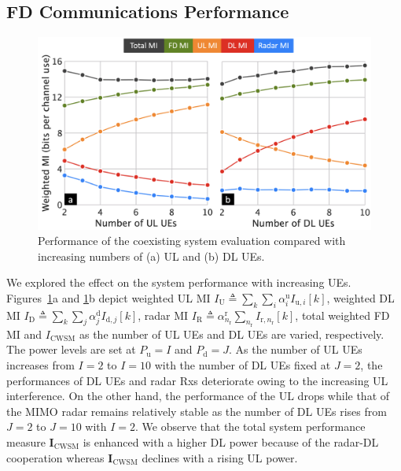 \documentclass[9pt,journal]{IEEEtran}
\newcommand{\bracket}[1]{{\left [{#1}\right ]}}
\newcommand{\rr}{_\mathrm{r}}
\theoremstyle{definition}
\begin{document}
{\subsection{FD Communications Performance}
\label{subsec: fd_comm_eva}
\begin{figure}[t]
\vspace{-1em}
\centering
\includegraphics[width=0.9\columnwidth]{fd_UE.png}
\caption{Performance of the coexisting system evaluation compared with increasing numbers of (a) UL and (b) DL UEs.}
\label{fig:fd_UE}
\vspace{-1em}
\end{figure}
We explored the effect on the system performance with increasing UEs. Figures~\ref{fig:fd_UE}a and \ref{fig:fd_UE}b depict weighted UL MI $\mathit{I}_{\textrm{U}}\triangleq\sum_{k}\sum_{i}\alpha^\textrm{u}_i\mathit{I}_{\textrm{u},i}\bracket{k}$, weighted DL MI $\mathit{I}_{\textrm{D}}\triangleq\sum_{k}\sum_{j}\alpha^\textrm{d}_j\mathit{I}_{\textrm{d},j}\bracket{k}$, radar MI $\mathit{I}_{\textrm{R}}\triangleq\alpha^\textrm{r}_{n\rr}\sum_{n\rr}\mathit{I}_{\textrm{r},n\rr}\bracket{k}$, total weighted FD MI and $\mathit{I}_{\textrm{CWSM}}$ as the number of UL UEs and DL UEs are varied, respectively. The power levels are set at $\mathit{P}_{\textrm{u}}=I$ and $\mathit{P}_{\textrm{d}}=J$. As the number of UL UEs 
increases from $\mathit{I}=2$ to $\mathit{I}=10$ with the number of DL UEs fixed at $\mathit{J}=2$, the performances of DL UEs and radar Rxs deteriorate owing to the increasing UL interference. On the other hand, the performance of the UL drops while that of the MIMO radar remains relatively stable as the number of DL UEs rises from $\mathit{J}=2$ to $\mathit{J}=10$ with $\mathit{I}=2$. We observe that the total system performance measure  $\mathbf{I}_{\textrm{CWSM}}$ is enhanced with a higher DL power because of the radar-DL cooperation whereas $\mathbf{I}_{\textrm{CWSM}}$ declines with a rising UL power. 

}
\end{document}

